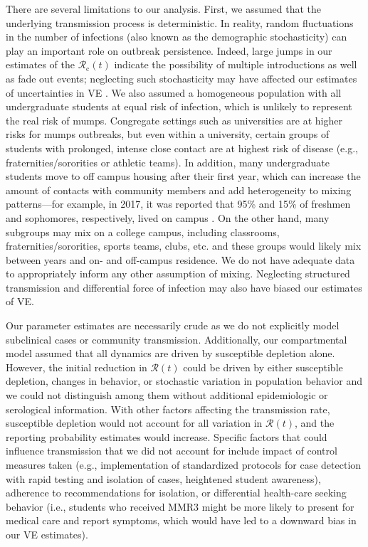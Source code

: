 \documentclass[12pt]{article}
\begin{document}
There are several limitations to our analysis. 
First, we assumed that the underlying transmission process is deterministic. 
In reality, random fluctuations in the number of infections (also known as the demographic stochasticity) can play an important role on outbreak persistence.
Indeed, large jumps in our estimates of the $\mathcal{R}_{\mathrm c}(t)$ indicate the possibility of multiple introductions as well as fade out events;
neglecting such stochasticity may have affected our estimates of uncertainties in VE \citep{king2015avoidable}.
We also assumed a homogeneous population with all undergraduate students at equal risk of infection, which is unlikely to represent the real risk of mumps. 
Congregate settings such as universities are at higher risks for mumps outbreaks, but even within a university, certain groups of students with prolonged, intense close contact are at highest risk of disease (e.g., fraternities/sororities or athletic teams). 
In addition, many undergraduate students move to off campus housing after their first year, which can increase the amount of contacts with community members and add heterogeneity to mixing patterns---for example, in 2017, it was reported that 95\% and 15\% of freshmen and sophomores, respectively, lived on campus \citep{news}.
On the other hand, many subgroups may mix on a college campus, including classrooms, fraternities/sororities, sports teams, clubs, etc. and these groups would likely mix between years and on- and off-campus residence. 
We do not have adequate data to appropriately inform any other assumption of mixing. 
Neglecting structured transmission and differential force of infection may also have biased our estimates of VE.

Our parameter estimates are necessarily crude as we do not explicitly model subclinical cases or community transmission.
Additionally, our compartmental model assumed that all dynamics are driven by susceptible depletion alone.
However, the initial reduction in $\mathcal R(t)$ could be driven by either susceptible depletion, changes in behavior, or stochastic variation in population behavior and we could not distinguish among them without additional epidemiologic or serological information.
With other factors affecting the transmission rate, susceptible depletion would not account for all variation in $\mathcal R(t)$, and the reporting probability estimates would increase.
Specific factors that could influence transmission that we did not account for include impact of control measures taken (e.g., implementation of standardized protocols for case detection with rapid testing and isolation of cases, heightened student awareness), adherence to recommendations for isolation, or differential health-care seeking behavior (i.e., students who received MMR3 might be more likely to present for medical care and report symptoms, which would have led to a downward bias in our VE estimates).
\end{document}
